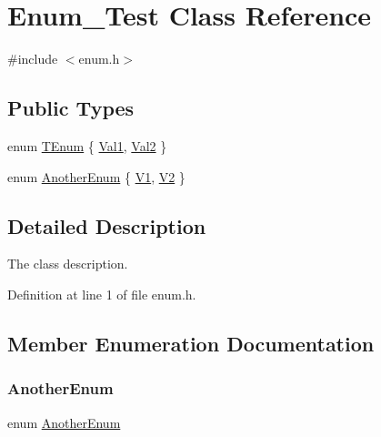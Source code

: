 \hypertarget{class_enum___test}{}\section{Enum\+\_\+\+Test Class Reference}
\label{class_enum___test}


{\ttfamily \#include $<$enum.\+h$>$}

\subsection*{Public Types}
\begin{DoxyCompactItemize}
\item 
enum \hyperlink{class_enum___test_a33e3643b66dfa91e4fb7cc663a23e166}{T\+Enum} \{ \hyperlink{class_enum___test_a33e3643b66dfa91e4fb7cc663a23e166ace53328155b5c1c55b0744a7429b9d02}{Val1}, 
\hyperlink{class_enum___test_a33e3643b66dfa91e4fb7cc663a23e166a470f89a037b58ee4ce04efe02907b410}{Val2}
 \}
\item 
enum \hyperlink{class_enum___test_a34ccf30f7cd970ac542d71619b2647f1}{Another\+Enum} \{ \hyperlink{class_enum___test_a34ccf30f7cd970ac542d71619b2647f1ae307daa999bfd69743cd368d6d372c82}{V1}, 
\hyperlink{class_enum___test_a34ccf30f7cd970ac542d71619b2647f1a3e329bb4aa8def056d4ae1e93751a652}{V2}
 \}
\end{DoxyCompactItemize}


\subsection{Detailed Description}
The class description. 

Definition at line 1 of file enum.\+h.



\subsection{Member Enumeration Documentation}
\mbox{\label{class_enum___test_a34ccf30f7cd970ac542d71619b2647f1}} 
\subsubsection{\texorpdfstring{Another\+Enum}{AnotherEnum}}
{\footnotesize\ttfamily enum \hyperlink{class_enum___test_a34ccf30f7cd970ac542d71619b2647f1}{Another\+Enum}}

